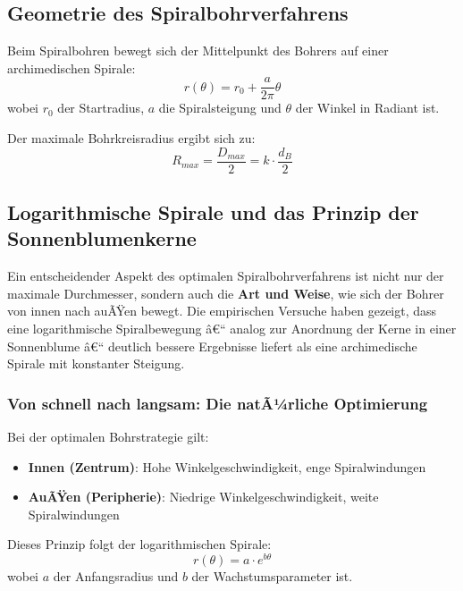 ﻿\documentclass[12pt,a4paper]{article}
\begin{document}
\subsection{Geometrie des Spiralbohrverfahrens}

Beim Spiralbohren bewegt sich der Mittelpunkt des Bohrers auf einer archimedischen Spirale:
\begin{equation}
	r(\theta) = r_0 + \frac{a}{2\pi}\theta
\end{equation}
wobei $r_0$ der Startradius, $a$ die Spiralsteigung und $\theta$ der Winkel in Radiant ist.

Der maximale Bohrkreisradius ergibt sich zu:
\begin{equation}
	R_{max} = \frac{D_{max}}{2} = k \cdot \frac{d_B}{2}
\end{equation}

\subsection{Logarithmische Spirale und das Prinzip der Sonnenblumenkerne}

Ein entscheidender Aspekt des optimalen Spiralbohrverfahrens ist nicht nur der maximale Durchmesser, sondern auch die \textbf{Art und Weise}, wie sich der Bohrer von innen nach auÃŸen bewegt. Die empirischen Versuche haben gezeigt, dass eine logarithmische Spiralbewegung â€“ analog zur Anordnung der Kerne in einer Sonnenblume â€“ deutlich bessere Ergebnisse liefert als eine archimedische Spirale mit konstanter Steigung.

\subsubsection{Von schnell nach langsam: Die natÃ¼rliche Optimierung}

Bei der optimalen Bohrstrategie gilt:
\begin{itemize}
	\item \textbf{Innen (Zentrum)}: Hohe Winkelgeschwindigkeit, enge Spiralwindungen
	\item \textbf{AuÃŸen (Peripherie)}: Niedrige Winkelgeschwindigkeit, weite Spiralwindungen
\end{itemize}

Dieses Prinzip folgt der logarithmischen Spirale:
\begin{equation}
	r(\theta) = a \cdot e^{b\theta}
\end{equation}
wobei $a$ der Anfangsradius und $b$ der Wachstumsparameter ist.
\end{document}
